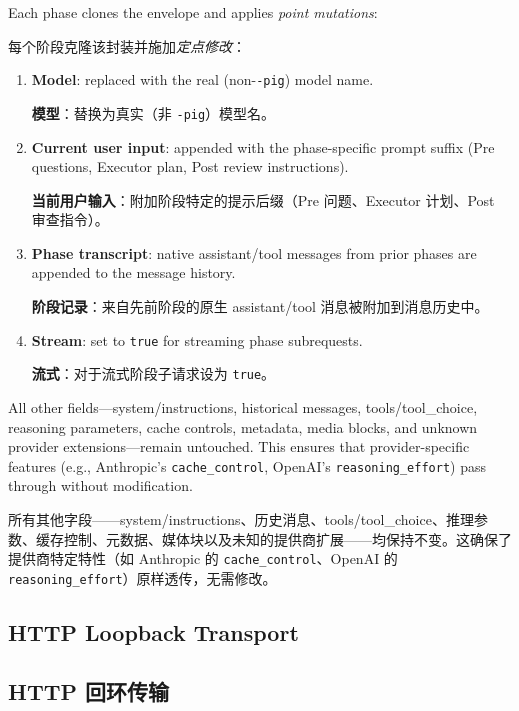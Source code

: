 Each phase clones the envelope and applies \emph{point mutations}:
\begin{chinese}
每个阶段克隆该封装并施加\emph{定点修改}：
\end{chinese}

\begin{enumerate}[nosep]
    \item \textbf{Model}: replaced with the real (non-\texttt{-pig}) model name.
    \begin{chinese}
    \textbf{模型}：替换为真实（非 \texttt{-pig}）模型名。
    \end{chinese}
    \item \textbf{Current user input}: appended with the phase-specific prompt suffix (Pre questions, Executor plan, Post review instructions).
    \begin{chinese}
    \textbf{当前用户输入}：附加阶段特定的提示后缀（Pre 问题、Executor 计划、Post 审查指令）。
    \end{chinese}
    \item \textbf{Phase transcript}: native assistant/tool messages from prior phases are appended to the message history.
    \begin{chinese}
    \textbf{阶段记录}：来自先前阶段的原生 assistant/tool 消息被附加到消息历史中。
    \end{chinese}
    \item \textbf{Stream}: set to \texttt{true} for streaming phase subrequests.
    \begin{chinese}
    \textbf{流式}：对于流式阶段子请求设为 \texttt{true}。
    \end{chinese}
\end{enumerate}

All other fields---system/instructions, historical messages, tools/tool\_choice, reasoning parameters, cache controls, metadata, media blocks, and unknown provider extensions---remain untouched. This ensures that provider-specific features (e.g., Anthropic's \texttt{cache\_control}, OpenAI's \texttt{reasoning\_effort}) pass through without modification.
\begin{chinese}
所有其他字段——system/instructions、历史消息、tools/tool\_choice、推理参数、缓存控制、元数据、媒体块以及未知的提供商扩展——均保持不变。这确保了提供商特定特性（如 Anthropic 的 \texttt{cache\_control}、OpenAI 的 \texttt{reasoning\_effort}）原样透传，无需修改。
\end{chinese}

\subsection{HTTP Loopback Transport}
\label{sec:loopback}
\begin{chinese}
\subsection{HTTP 回环传输}
\end{chinese}


